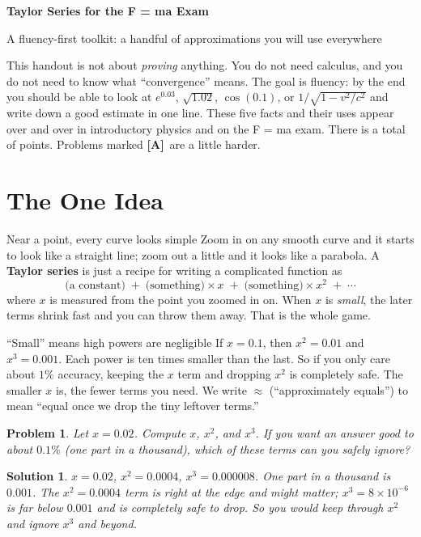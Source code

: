 \documentclass[11pt]{article}
\newcommand{\clearpts}{\addtocounter{tpts}{\value{cpts}} \setcounter{cpts}{0}}
\newcommand{\pts}[1]{\clearpts \setcounter{cpts}{#1}}
\newcommand{\totpts}{\setcounter{endpts}{\totvalue{tpts} + \totvalue{cpts}}\arabic{endpts}}
\newcommand{\ptfmt}[1]{\textbf{\color{ptred}#1\color{black}}}
\newcommand{\advanced}{\!\textbf{\color{advblue}[A]\color{black}}\ }
\newtheorem*{solution}{Solution}
\theoremstyle{mystyle}
\newtheorem{pproblem}{Problem}
\newcommand{\psettitle}[1]{
    \begin{center}
    \huge \textbf{#1}
    \end{center}
}
\begin{document}
\psettitle{Taylor Series for the F = ma Exam}
\begin{center}
\large A fluency-first toolkit: a handful of approximations you will use everywhere
\end{center}

\noindent
This handout is not about \emph{proving} anything. You do not need calculus, and you do
not need to know what ``convergence'' means. The goal is fluency: by the end you should
be able to look at $e^{0.03}$, $\sqrt{1.02}$, $\cos(0.1)$, or $1/\sqrt{1-v^2/c^2}$ and
write down a good estimate in one line. These five facts and their uses appear over and
over in introductory physics and on the F = ma exam. There is a total of
\ptfmt{\totpts} points. Problems marked \advanced are a little harder.

\section{The One Idea}

\begin{psidea}{Near a point, every curve looks simple}{}
Zoom in on any smooth curve and it starts to look like a straight line; zoom out a
little and it looks like a parabola. A \textbf{Taylor series} is just a recipe for
writing a complicated function as
\[
\text{(a constant)} \;+\; \text{(something)}\times x \;+\;
\text{(something)}\times x^2 \;+\; \cdots
\]
where $x$ is measured from the point you zoomed in on. When $x$ is \emph{small}, the
later terms shrink fast and you can throw them away. That is the whole game.
\end{psidea}

\begin{psidea}{``Small'' means high powers are negligible}{}
If $x = 0.1$, then $x^2 = 0.01$ and $x^3 = 0.001$. Each power is ten times smaller than
the last. So if you only care about $1\%$ accuracy, keeping the $x$ term and dropping
$x^2$ is completely safe. The smaller $x$ is, the fewer terms you need. We write
$\approx$ (``approximately equals'') to mean ``equal once we drop the tiny leftover
terms.''
\end{psidea}

\pts{3}
\begin{pproblem}
Let $x = 0.02$. Compute $x$, $x^2$, and $x^3$. If you want an answer good to about
$0.1\%$ (one part in a thousand), which of these terms can you safely ignore?
\end{pproblem}
\begin{solution}
$x = 0.02$, $x^2 = 0.0004$, $x^3 = 0.000008$. One part in a thousand is $0.001$. The
$x^2 = 0.0004$ term is right at the edge and might matter; $x^3 = 8\times10^{-6}$ is far
below $0.001$ and is completely safe to drop. So you would keep through $x^2$ and ignore
$x^3$ and beyond.
\end{solution}
\end{document}
